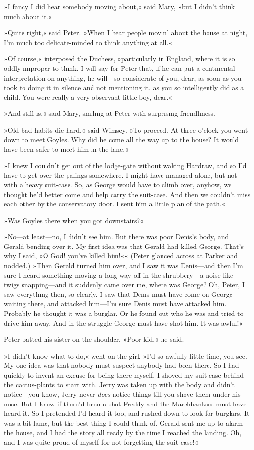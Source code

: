 »I fancy I did hear somebody moving about,« said Mary, »but I didn't think much about it.«

»Quite right,« said Peter. »When I hear people movin' about the house at night, I'm much too delicate-minded to think anything at all.«

»Of course,« interposed the Duchess, »particularly in England, where it is so oddly improper to think. I will say for Peter that, if he can put a continental interpretation on anything, he will—so considerate of you, dear, as soon as you took to doing it in silence and not mentioning it, as you so intelligently did as a child. You were really a very observant little boy, dear.«

»And still is,« said Mary, smiling at Peter with surprising friendliness.

»Old bad habits die hard,« said Wimsey. »To proceed. At three o'clock you went down to meet Goyles. Why did he come all the way up to the house? It would have been safer to meet him in the lane.«

»I knew I couldn't get out of the lodge-gate without waking Hardraw, and so I'd have to get over the palings somewhere. I might have managed alone, but not with a heavy suit-case. So, as George would have to climb over, anyhow, we thought he'd better come and help carry the suit-case. And then we couldn't miss each other by the conservatory door. I sent him a little plan of the path.«

»Was Goyles there when you got downstairs?«

»No—at least—no, I didn't see him. But there was poor Denis's body, and Gerald bending over it. My first idea was that Gerald had killed George. That's why I said, »O God! you've killed him!«« (Peter glanced across at Parker and nodded.) »Then Gerald turned him over, and I saw it was Denis—and then I'm sure I heard something moving a long way off in the shrubbery—a noise like twigs snapping—and it suddenly came over me, where was George? Oh, Peter, I saw everything then, so clearly. I saw that Denis must have come on George waiting there, and attacked him—I'm sure Denis must have attacked him. Probably he thought it was a burglar. Or he found out who he was and tried to drive him away. And in the struggle George must have shot him. It was awful!«

Peter patted his sister on the shoulder. »Poor kid,« he said.

»I didn't know what to do,« went on the girl. »I'd so awfully little time, you see. My one idea was that nobody must suspect anybody had been there. So I had quickly to invent an excuse for being there myself. I shoved my suit-case behind the cactus-plants to start with.  Jerry was taken up with the body and didn't notice—you know, Jerry never \textit{does} notice things till you shove them under his nose. But I knew if there'd been a shot Freddy and the Marchbankses must have heard it. So I pretended I'd heard it too, and rushed down to look for burglars. It was a bit lame, but the best thing I could think of.  Gerald sent me up to alarm the house, and I had the story all ready by the time I reached the landing. Oh, and I was quite proud of myself for not forgetting the suit-case!«

